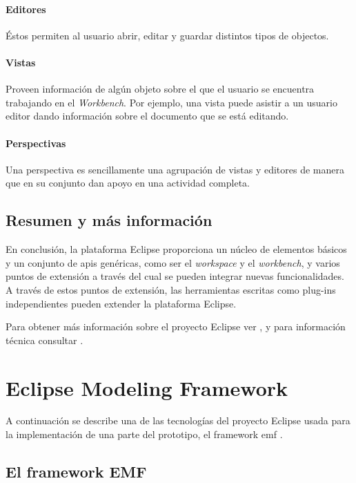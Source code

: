 \documentclass[a4paper,12pt,oneside,spanish]{book}
\begin{document}
\paragraph{Editores} Éstos permiten al usuario abrir, editar y guardar distintos tipos de objectos.

\paragraph{Vistas} Proveen información de algún objeto sobre el que el usuario se encuentra trabajando en el \textit{Workbench}. Por ejemplo, una vista puede asistir a un usuario editor dando información sobre el documento que se está editando.

\paragraph{Perspectivas} Una perspectiva es sencillamente una agrupación de vistas y editores de manera que en su conjunto dan apoyo en una actividad completa.


\subsection{Resumen y más información}

En conclusión, la plataforma \textsf{Eclipse} proporciona un núcleo de elementos básicos y un conjunto de \glspl{api} genéricas, como ser el \textit{workspace} y el \textit{workbench}, y varios puntos de extensión a través del cual se pueden integrar nuevas funcionalidades. A través de estos puntos de extensión, las herramientas escritas como plug-ins independientes pueden extender la plataforma \textsf{Eclipse}.

Para obtener más información sobre el proyecto \textsf{Eclipse} ver \cite[\url{www.eclipse.org}]{Eclipse}, y para información técnica consultar \cite[Eclipse Platform Technical Overview]{EclipseTech}.


\section{Eclipse Modeling Framework}

A continuación se describe una de las tecnologías del proyecto \textsf{Eclipse} usada para la implementación de una parte del prototipo, el framework \gls{emf} \cite{EMF}.

\subsection{El framework EMF}
\end{document}
